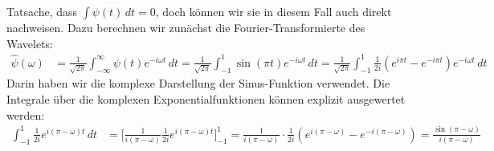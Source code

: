 \begin{loesung}
\begin{teilaufgaben}
Tatsache, dass $\int \psi(t)\,dt=0$, doch können wir sie in diesem Fall
auch direkt nachweisen.
Dazu berechnen wir zunächst die Fourier-Transformierte des Wavelets:
\begin{align*}
\hat{\psi}(\omega)
&=
\frac{1}{\sqrt{2\pi}}
\int_{-\infty}^\infty \psi(t)e^{-i\omega t}\,dt
=
\frac{1}{\sqrt{2\pi}}
\int_{-1}^{1} \sin(\pi t)e^{-i\omega t}\,dt
=
\frac{1}{\sqrt{2\pi}}
\int_{-1}^1
\frac1{2i} (e^{i\pi t}-e^{-i\pi t})e^{-i\omega t}\,dt
\end{align*}
Darin haben wir die komplexe Darstellung der Sinus-Funktion verwendet.
Die Integrale über die komplexen Exponentialfunktionen können explizit
ausgewertet werden:
\begin{align*}
\int_{-1}^1 \frac{1}{2i}e^{i(\pi-\omega)t}\,dt
&=
\biggl[
\frac{1}{i(\pi-\omega)}
\frac1{2i}
e^{i(\pi-\omega)t}
\biggr]_{-1}^1
=
\frac{1}{i(\pi-\omega)}
\cdot
\frac1{2i}(e^{i(\pi-\omega)}-e^{-i(\pi-\omega)})
=
\frac{\sin(\pi-\omega)}{i(\pi-\omega)}
\\
\end{align*}
\end{teilaufgaben}
\end{loesung}
